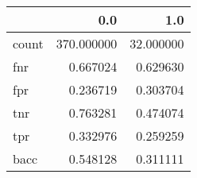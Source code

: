 \begin{tabular}{lrr}
\toprule
{} &         0.0 &        1.0 \\
\midrule
count &  370.000000 &  32.000000 \\
fnr   &    0.667024 &   0.629630 \\
fpr   &    0.236719 &   0.303704 \\
tnr   &    0.763281 &   0.474074 \\
tpr   &    0.332976 &   0.259259 \\
bacc  &    0.548128 &   0.311111 \\
\bottomrule
\end{tabular}
